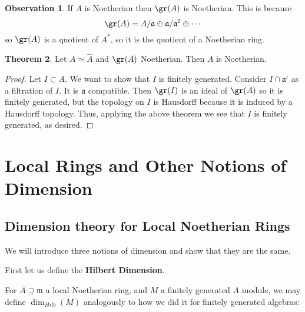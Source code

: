 \documentclass[12 pt]{article}
\theoremstyle{definition}
\newtheorem{thm}{Theorem}[section]
\newtheorem{obs}[thm]{Observation}
\renewcommand{\(}{\left(}
\renewcommand{\)}{\right)}
\newcommand\fa{{\mathfrak a}}
\newcommand\fm{{\mathfrak m}}
\begin{document}
\begin{obs} If $A$ is Noetherian then $\gr(A)$ is Noetherian. This is because
\[\gr(A) = A/\fa \oplus \fa/\fa^2 \oplus \cdots\]
so $\gr(A)$ is a quotient of $A^*$, so it is the quotient of a Noetherian ring.
\end{obs}

\begin{thm} Let $A \simeq \hat{A}$ and $\gr(A)$ Noetherian. Then $A$ is Noetherian.
\end{thm}
\begin{proof} Let $I \subset A$. We want to show that $I$ is finitely generated. Consider $I \cap \fa^i$ as a filtration of $I$. It is $\fa$ compatible. Then $\gr(I)$ is an ideal of $\gr(A)$ so it is finitely generated, but the topology on $I$ is Hausdorff because it is induced by a Hausdorff topology. Thus, applying the above theorem we see that $I$ is finitely generated, as desired.
\end{proof}



\newpage


\section{Local Rings and Other Notions of Dimension}



\subsection{Dimension theory for Local Noetherian Rings}

We will introduce three notions of dimension and show that they are the same.

First let us define the \textbf{Hilbert Dimension}.

For $A \supseteq \fm$ a local Noetherian ring, and $M$ a finitely generated $A$ module, we may define $\dim_{Hilb}(M)$ analogously to how we did it for finitely generated algebras:
\end{document}

